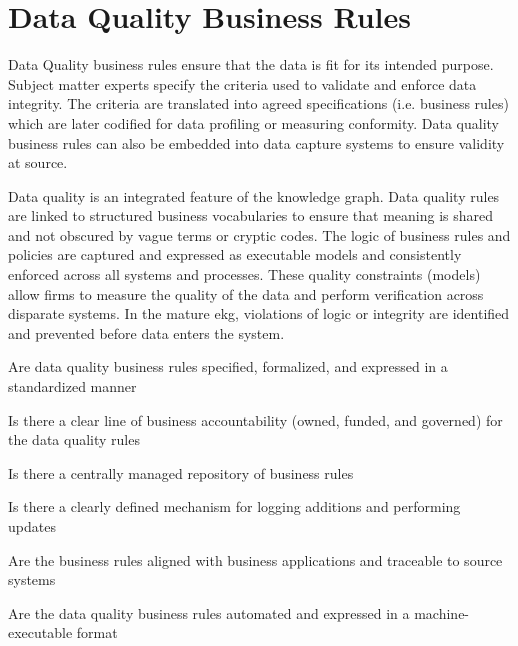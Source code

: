\section{Data Quality Business Rules}\label{sec:ekgmm-b-3-2} %

Data Quality business rules ensure that the data is fit for its intended purpose.
Subject matter experts specify the criteria used to validate and enforce data integrity.
The criteria are translated into agreed specifications (i.e. business rules) which are later codified for
data profiling or measuring conformity.
Data quality business rules can also be embedded into data capture systems to ensure validity at source.

\ekgmmContextSection

Data quality is an integrated feature of the knowledge graph.
Data quality rules are linked to structured business vocabularies to ensure that meaning
is shared and not obscured by vague terms or cryptic codes.
The logic of business rules and policies are captured and expressed as executable models and consistently
enforced across all systems and processes.
These quality constraints (models) allow firms to measure the quality of the data and perform verification across
disparate systems.
In the mature \gls{ekg}, violations of logic or integrity are identified and prevented before data
enters the system.

\kgmmcorequestionssection

\begin{core-questions}

  \item [\thesection.1] Are data quality business rules specified, formalized, and expressed in a standardized manner
  \item [\thesection.2] Is there a clear line of business accountability (owned, funded, and governed) for the
                        data quality rules
  \item [\thesection.3] Is there a centrally managed repository of business rules
  \item [\thesection.4] Is there a clearly defined mechanism for logging additions and performing updates
  \item [\thesection.5] Are the business rules aligned with business applications and traceable to source systems
  \item [\thesection.6] Are the data quality business rules automated and expressed in a machine-executable format

\end{core-questions}

